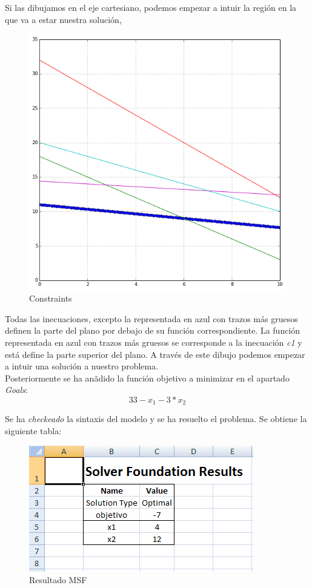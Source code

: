 \documentclass[a4paper,12pt]{article}
\begin{document}
Si las dibujamos en el eje cartesiano, podemos empezar a intuir la regi\'on en la que va a estar nuestra soluci\'on,

\begin{figure}[h!]
  \centering
	\includegraphics[scale=0.4]{constraints.png}
	  \caption{Constraints}
\end{figure}

Todas las inecuaciones, excepto la representada en azul con trazos m\'as gruesos definen la parte del plano por debajo de su funci\'on correspondiente. La funci\'on representada en azul con trazos m\'as gruesos se corresponde a la inecuaci\'on \textit{c1} y est\'a define la parte superior del plano. A trav\'es de este dibujo podemos empezar a intuir una soluci\'on a nuestro problema.\\

Posteriormente se ha an\~adido la funci\'on objetivo a minimizar en el apartado \textit{Goals}: $$33 - x_1 -3*x_2$$

Se ha \textit{checkeado} la sintaxis del modelo y se ha resuelto el problema. Se obtiene la siguiente tabla:

\begin{figure}[h!]
  \centering
	\includegraphics[scale=0.8]{msf.png}
	  \caption{Resultado MSF}
\end{figure}
\end{document}
